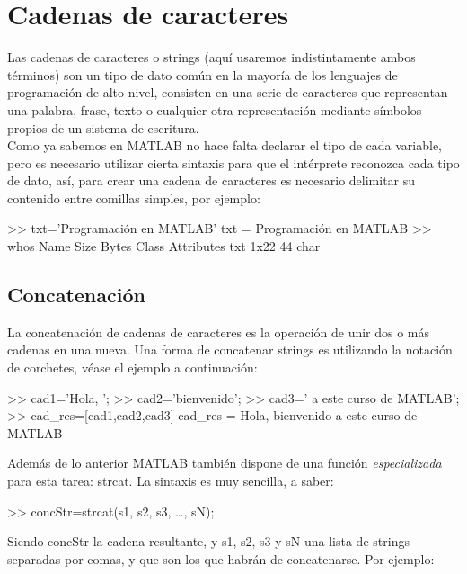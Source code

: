 \section{Cadenas de caracteres}\label{cadenas-de-caracteres}

Las cadenas de caracteres o strings (aquí usaremos indistintamente ambos
términos) son un tipo de dato común en la mayoría de los lenguajes de
programación de alto nivel, consisten en una serie de caracteres que
representan una palabra, frase, texto o cualquier otra representación
mediante símbolos propios de un sistema de escritura. \\

Como ya sabemos en MATLAB no hace falta declarar el tipo de cada
variable, pero es necesario utilizar cierta sintaxis para que el
intérprete reconozca cada tipo de dato, así, para crear una cadena de
caracteres es necesario delimitar su contenido entre comillas simples,
por ejemplo:

\begin{matlab}
>> txt='Programación en MATLAB'
txt =
Programación en MATLAB
>> whos
  Name      Size            Bytes  Class    Attributes
  txt       1x22               44  char    
\end{matlab}

\subsection{Concatenación}\label{concatenacion}

La concatenación de cadenas de caracteres es la operación de unir dos o
más cadenas en una nueva. Una forma de concatenar strings es utilizando
la notación de corchetes, véase el ejemplo a continuación:

\begin{matlab}
>> cad1='Hola, ';
>> cad2='bienvenido';
>> cad3=' a este curso de MATLAB';
>> cad_res=[cad1,cad2,cad3]
cad_res =
Hola, bienvenido a este curso de MATLAB
\end{matlab}

Además de lo anterior MATLAB también dispone de una función
\emph{especializada} para esta tarea: strcat. La sintaxis es muy
sencilla, a saber:

\begin{matlab}
>> concStr=strcat(s1, s2, s3, …, sN);
\end{matlab}

Siendo concStr la cadena resultante, y s1, s2, s3 y sN una lista de
strings separadas por comas, y que son los que habrán de concatenarse.
Por ejemplo:

